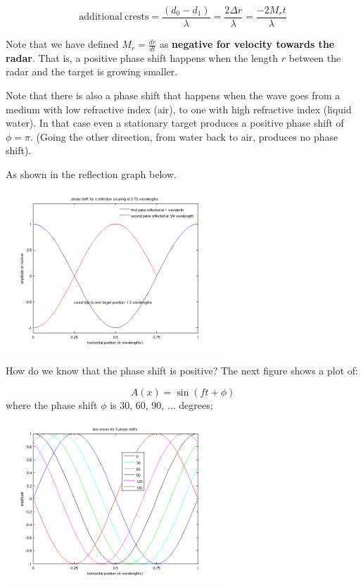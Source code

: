 \documentclass[12pt]{article}
\begin{document}
\begin{itemize}
\begin{equation}
  \label{eq:rip4}
  \mathrm{additional\ crests}=\frac{(d_0 - d_1) }{\lambda}
  =\frac{2 \Delta r }{\lambda} =  \frac{-2 M_r t }{\lambda}
\end{equation}

Note that we have defined $M_r = \frac{dr}{dt}$ as \textbf{negative for velocity towards the radar}.
That is, a positive phase shift happens when the length $r$ between the radar and the target
is growing smaller.

Note that there is also a phase shift that happens when the wave goes from a medium with
low refractive index (air), to one with high refractive index (liquid water).  In that case
even a stationary target produces a positive phase shift of $\phi = \pi$.  (Going the other
direction, from water back to air, produces no phase shift).   

As shown in the reflection graph below.

\includegraphics[width=0.6\textwidth]{figures_tex/reflection.png}


How do we know that the phase shift is positive?  The next figure
 shows a plot of:

\begin{equation*}
  A(x) = \sin(ft + \phi)
\end{equation*}
where the phase shift $\phi$ is 30, 60, 90, $\ldots$ degrees;

\includegraphics[width=0.6\textwidth]{figures_tex/sine_waves.png}


\end{itemize}
\end{document}
